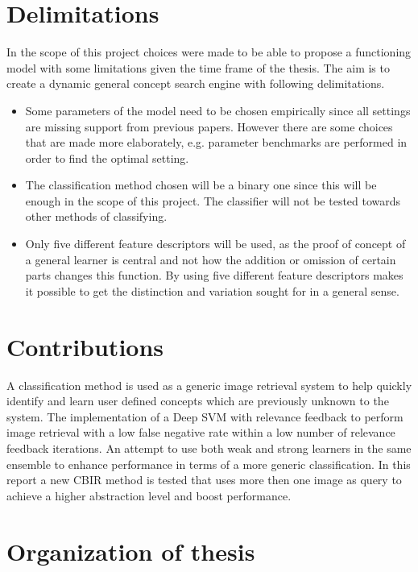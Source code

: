 \section{Delimitations}
\label{sec:intro:delimitations}
In the scope of this project choices were made to be able to propose a functioning model with some limitations given the time frame of the thesis. The aim is to create a dynamic general concept search engine with following delimitations.
\begin{itemize}
	\item Some parameters of the model need to be chosen empirically since all settings are missing support from previous papers. However there are some choices that are made more elaborately, e.g. parameter benchmarks are performed in order to find the optimal setting. 
	\item The classification method chosen will be a binary one since this will be enough in the scope of this project. The classifier will not be tested towards other methods of classifying.
	\item Only five different feature descriptors will be used, as the proof of concept of a general learner is central and not how the addition or omission of certain parts changes this function. By using five different feature descriptors makes it possible to get the distinction and variation sought for in a general sense.
\end{itemize}

\section{Contributions}

A classification method is used as a generic image retrieval system to help quickly identify and learn user defined concepts which are previously unknown to the system. 
The implementation of a Deep SVM with relevance feedback to perform image retrieval with a low false negative rate within a low number of relevance feedback iterations. 
An attempt to use both weak and strong learners in the same ensemble to enhance performance in terms of a more generic classification. In this report a new CBIR method is tested that uses more then one image as query to achieve a higher abstraction level and boost performance. 

\section{Organization of thesis}

